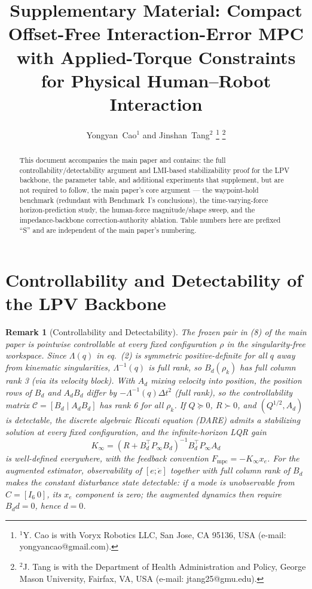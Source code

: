 \documentclass[journal]{IEEEtran}
\newtheorem{remark}{Remark}
\newcommand{\Laminv}{\Lambda^{-1}(q)}
\newcommand{\Fmpc}{F_{\text{mpc}}}
\begin{document}
\title{Supplementary Material: Compact Offset-Free Interaction-Error MPC
with Applied-Torque Constraints for Physical Human--Robot Interaction}

\author{Yongyan~Cao$^{1}$ and Jinshan~Tang$^{2}$%
\thanks{$^{1}$Y. Cao is with Voryx Robotics LLC, San Jose, CA 95136, USA
(e-mail: yongyancao@gmail.com).}%
\thanks{$^{2}$J. Tang is with the Department of Health Administration and
Policy, George Mason University, Fairfax, VA, USA
(e-mail: jtang25@gmu.edu).}}

\maketitle

\begin{abstract}
This document accompanies the main paper and contains: the full
controllability/detectability argument and LMI-based stabilizability
proof for the LPV backbone, the parameter table, and additional
experiments that supplement, but are not required to follow, the main
paper's core argument --- the waypoint-hold benchmark (redundant with
Benchmark~I's conclusions), the time-varying-force horizon-prediction
study, the human-force magnitude/shape sweep, and the impedance-backbone
correction-authority ablation. Table numbers here are prefixed ``S'' and
are independent of the main paper's numbering.
\end{abstract}

\section{Controllability and Detectability of the LPV Backbone}\label{sec:controllability}

\begin{remark}[Controllability and Detectability]\label{rem:feasibility}
The frozen pair in (8) of the main paper is pointwise controllable at every
fixed configuration $\rho$ in the singularity-free workspace. Since
$\Lambda(q)$ in eq.~(2) is symmetric positive-definite for all $q$ away
from kinematic singularities, $\Laminv$ is full rank, so $B_d(\rho_k)$
has full column rank 3 (via its velocity block). With $A_d$ mixing
velocity into position, the position rows of $B_d$ and $A_dB_d$ differ
by $-\Laminv\Delta t^2$ (full rank), so the controllability matrix
$\mathcal C=[B_d\mid A_dB_d]$ has rank 6 for all $\rho_k$. If
$Q\succeq0$, $R\succ0$, and $(Q^{1/2},A_d)$ is detectable, the discrete
algebraic Riccati equation (DARE) admits a stabilizing solution at every
fixed configuration, and the infinite-horizon LQR gain
\begin{equation*}
K_\infty=(R+B_d^\top P_\infty B_d)^{-1}B_d^\top P_\infty A_d
\end{equation*}
is well-defined everywhere, with the feedback convention
$\Fmpc=-K_\infty x_e$. For the augmented estimator, observability
of $[e;\dot e]$ together with full column rank of $B_d$ makes the
constant disturbance state detectable: if a mode is unobservable from
$C=[I_6\ 0]$, its $x_e$ component is zero; the augmented dynamics then
require $B_dd=0$, hence $d=0$.
\end{remark}
\end{document}
